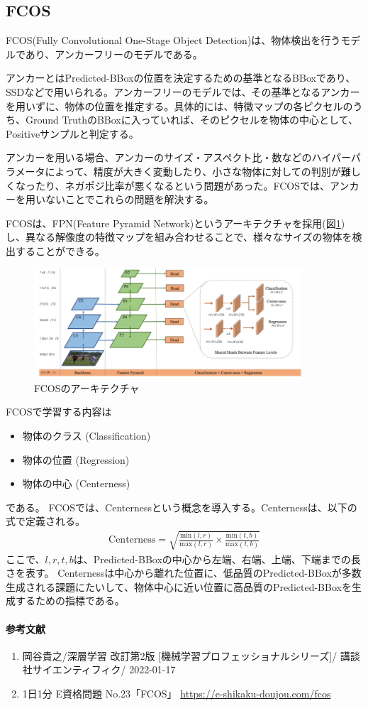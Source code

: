 \documentclass{ltjsarticle}
\begin{document}
\subsection{FCOS}
FCOS(Fully Convolutional One-Stage Object Detection)は、物体検出を行うモデルであり、アンカーフリーのモデルである。
\par
アンカーとはPredicted-BBoxの位置を決定するための基準となるBBoxであり、SSDなどで用いられる。アンカーフリーのモデルでは、その基準となるアンカーを用いずに、物体の位置を推定する。具体的には、特徴マップの各ピクセルのうち、Ground TruthのBBoxに入っていれば、そのピクセルを物体の中心として、Positiveサンプルと判定する。
\par
アンカーを用いる場合、アンカーのサイズ・アスペクト比・数などのハイパーパラメータによって、精度が大きく変動したり、小さな物体に対しての判別が難しくなったり、ネガポジ比率が悪くなるという問題があった。FCOSでは、アンカーを用いないことでこれらの問題を解決する。
\par
FCOSは、FPN(Feature Pyramid Network)というアーキテクチャを採用(図\ref{FCOS_Architecture})し、異なる解像度の特徴マップを組み合わせることで、様々なサイズの物体を検出することができる。
\begin{figure}[htbp]
  \centering
  \includegraphics[width=10cm]{./capture/FCOS_Architecture.png}
  \caption{FCOSのアーキテクチャ}
  \label{FCOS_Architecture}
\end{figure}
\par
FCOSで学習する内容は
\begin{itemize}
  \item 物体のクラス (Classification)
  \item 物体の位置 (Regression)
  \item 物体の中心 (Centerness)
\end{itemize}
である。
FCOSでは、Centernessという概念を導入する。Centernessは、以下の式で定義される。
\begin{align}
  \text{Centerness} = \sqrt{\frac{\text{min}(l, r)}{\text{max}(l, r)} \times \frac{\text{min}(t, b)}{\text{max}(t, b)}}
\end{align}
ここで、$l, r, t, b$は、Predicted-BBoxの中心から左端、右端、上端、下端までの長さを表す。
Centernessは中心から離れた位置に、低品質のPredicted-BBoxが多数生成される課題にたいして、物体中心に近い位置に高品質のPredicted-BBoxを生成するための指標である。




\clearpage
\paragraph{参考文献}
\begin{enumerate}
  \item 岡谷貴之/深層学習 改訂第2版 [機械学習プロフェッショナルシリーズ]/ 講談社サイエンティフィク/ 2022-01-17
  \item 1日1分 E資格問題 No.23「FCOS」 \url{https://e-shikaku-doujou.com/fcos}
\end{enumerate}

\newpage
\end{document}
